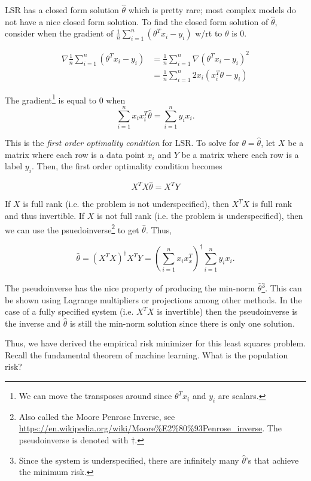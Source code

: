 LSR has a closed form solution $\hat{\theta}$ which is pretty rare; most complex models do not have a nice closed form solution. To find the closed form solution of $\hat{\theta}$, consider when the gradient of $\frac{1}{n}\sum_{i=1}^{n}(\theta^T x_i - y_i)$ w/rt to $\theta$ is 0.

\begin{align}
\nabla \frac{1}{n}\sum_{i=1}^{n}(\theta^T x_i - y_i) &= \frac{1}{n}\sum_{i=1}^{n} \nabla (\theta^T x_i - y_i)^2 \\
&= \frac{1}{n} \sum_{i=1}^{n} 2x_i(x_i^T \theta - y_i)
\end{align}

The gradient\footnote{We can move the transposes around since $\theta^Tx_i$ and $y_i$ are scalars.} is equal to 0 when 
$$\sum_{i=1}^{n} x_ix_i^T\hat{\theta} = \sum_{i=1}^n y_ix_i.$$

This is the \textit{first order optimality condition} for LSR. To solve for $\theta = \hat{\theta}$, let $X$ be a matrix where each row is a data point $x_i$ and $Y$ be a matrix where each row is a label $y_i$. Then, the first order optimality condition becomes

$$X^TX\hat{\theta} = X^T Y$$

If $X$ is full rank (i.e. the problem is not underspecified), then $X^TX$ is full rank and thus invertible. 
If $X$ is not full rank (i.e. the problem is underspecified), then we can use the psuedoinverse\footnote{Also called the Moore Penrose Inverse, see \url{https://en.wikipedia.org/wiki/Moore\%E2\%80\%93Penrose_inverse}. The pseudoinverse is denoted with $\dag$.} to get $\hat{\theta}$. Thus, 

$$\hat{\theta} = (X^TX)^{\dag}X^TY = (\sum_{i=1}^{n} x_i x_x^T)^{\dag} \sum_{i=1}^{n} y_ix_i.$$

The pseudoinverse has the nice property of producing the min-norm $\hat{\theta}$\footnote{Since the system is underspecified, there are infinitely many $\hat{\theta}$'s that achieve the minimum risk.}. This can be shown using Lagrange multipliers or projections among other methods. In the case of a fully specified system (i.e. $X^TX$ is invertible) then the pseudoinverse is the inverse and $\hat{\theta}$ is still the min-norm solution since there is only one solution.

Thus, we have derived the empirical risk minimizer for this least squares problem. 
Recall the fundamental theorem of machine learning.
What is the population risk?


